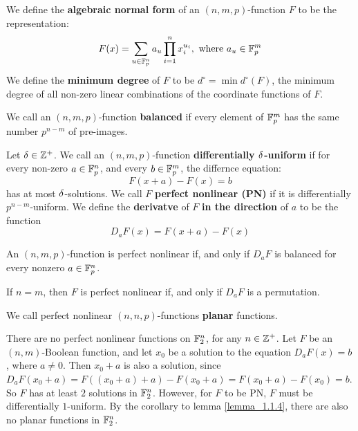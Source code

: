 \begin{definition}
  We define the \textbf{algebraic normal form} of an $(n,m,p)$-function $F$ to
  be the representation:
  \begin{equation}\label{equation_1.7}
    F(x)=\sum_{u \in \mathbb{F}_p^n}{a_u\prod_{i=1}^nx_i^{u_i}}, \text{ where }
    a_u \in \mathbb{F}_p^m
  \end{equation}
  We define the \textbf{minimum degree} of $F$ to be
  $d^\circ=\min{d^\circ(F)}$, the minimum degree of all non-zero linear
  combinations of the coordinate functions of $F$.
\end{definition}

\begin{definition}
  We call an $(n,m,p)$-function \textbf{balanced} if every element of $\mathbb{F}_p^m$
  has the same number $p^{n-m}$ of pre-images.
\end{definition}

\begin{defition}
  Let $\delta \in \mathbb{Z}^+$. We call an $(n,m,p)$-function \textbf{differentially
  $\delta$-uniform} if for every non-zero $a \in \mathbb{F}_p^n$, and every $b \in \mathbb{F}_p^m$,
  the differnce equation:
  \begin{equation}\label{equation_1.8}
    F(x+a)-F(x)=b
  \end{equation}
  has at most $\delta$-solutions. We call $F$ \textbf{perfect nonlinear (PN)} if it
  is differentially $p^{n-m}$-uniform. We define the \textbf{derivatve} of $F$
  \textbf{in the direction} of $a$ to be the function
  \begin{equation*}
    D_a{F(x)}=F(x+a)-F(x)
  \end{equation*}
\end{defition}

\begin{lemma}\label{lemma_1.1.4}
  An $(n,m,p)$-function is perfect nonlinear if, and only if $D_a{F}$ is
  balanced for every nonzero $a \in \mathbb{F}_p^n$.
\end{lemma}
\begin{corollary}
  If $n=m$, then $F$ is perfect nonlinear if, and only if $D_a{F}$ is a
  permutation.
\end{corollary}

\begin{definition}
  We call perfect nonlinear $(n,n,p)$-functions \textbf{planar} functions.
\end{definition}

\begin{example}
  There are no perfect nonlinear functions on $\mathbb{F}_2^n$, for any $n \in \mathbb{Z}^+$. Let
  $F$ be an $(n,m)$-Boolean function, and let $x_0$ be a solution to the equation
  $D_a{F(x)}=b$, where $a \neq 0$. Then $x_0+a$ is also a solution, since
  $D_a{F(x_0+a)}=F((x_0+a)+a)-F(x_0+a)=F(x_0+a)-F(x_0)=b$. So $F$ has at least
  $2$ solutions in $\mathbb{F}_2^n$. However, for  $F$ to be PN, $F$ must be
  differentially $1$-uniform. By the corollary to lemma \ref{lemma_1.1.4}, there
  are also no planar functions in $\mathbb{F}_2^n$.
\end{example}

